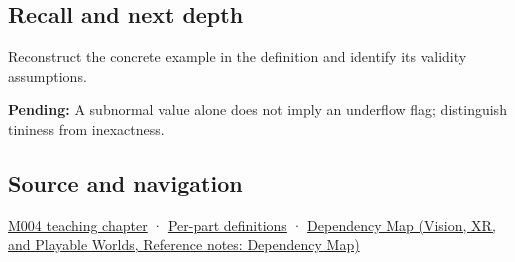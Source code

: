\subsection{Recall and next depth}\label{appendix-00a6e044c437-recall-and-next-depth}

Reconstruct the concrete example in the definition and identify its validity assumptions.

\textbf{Pending:} A subnormal value alone does not imply an underflow flag; distinguish tininess from inexactness.

\subsection{Source and navigation}\label{appendix-00a6e044c437-source-and-navigation}

\hyperref[01-foundations-i-ch001-a-stretching-ruler-for-real-valued-quantities]{M004 teaching chapter} · \hyperref[appendix-fd090d982a15-m004---parts-61-76]{Per-part definitions} · \href{../07-Vision-XR-and-Playable-Worlds/main.pdf\#nameddest=appendix-4ad47bdd269a}{Dependency Map (Vision, XR, and Playable Worlds, Reference notes: Dependency Map)}
